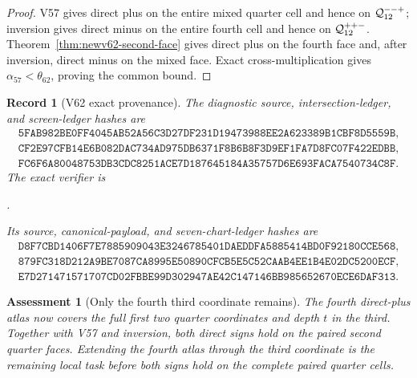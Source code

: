 \documentclass[11pt,oneside]{article}
\newtheorem{assessment}[theorem]{Assessment}
\newtheorem{record}[theorem]{Record}
\theoremstyle{definition}
\theoremstyle{remark}
\begin{document}
\begin{proof}
V57 gives direct plus on the entire mixed quarter cell and hence
on \({\cal Q}^{--+}_{12}\); inversion gives direct minus on the
entire fourth cell and hence on \({\cal Q}^{++-}_{12}\).
Theorem~\ref{thm:newv62-second-face} gives direct plus on the fourth
face and, after inversion, direct minus on the mixed face.  Exact
cross-multiplication gives \(\alpha_{57}<\theta_{62}\), proving the
common bound.
\end{proof}

\begin{record}[V62 exact provenance]
\label{rec:newv62-provenance}
The diagnostic source, intersection-ledger, and screen-ledger
hashes are
\[
\begin{gathered}
\texttt{5FAB982BE0FF4045AB52A56C3D27DF231D19473988EE2A623389B1CBF8D5559B},\\
\texttt{CF2E97CFB14E6B082DAC734AD975DB6371F8B6B8F3D9EF1FA7D8FC07F422EDBB},\\
\texttt{FC6F6A80048753DB3CDC8251ACE7D187645184A35757D6E693FACA7540734C8F}.
\end{gathered}                                        \tag{62.12}
\]
The exact verifier is
\begin{center}
\footnotesize
{}.
\end{center}
Its source, canonical-payload, and seven-chart-ledger hashes are
\[
\begin{gathered}
\texttt{D8F7CBD1406F7E7885909043E3246785401DAEDDFA5885414BD0F92180CCE568},\\
\texttt{879FC318D212A9BE7087CA8995E50890CFCB5E5C52CAAB4EE1B4E02DC5200ECF},\\
\texttt{E7D271471571707CD02FBBE99D302947AE42C147146BB985652670ECE6DAF313}.
\end{gathered}                                        \tag{62.13}
\]
\end{record}

\begin{assessment}[Only the fourth third coordinate remains]
\label{ass:newv62}
The fourth direct-plus atlas now covers the full first two quarter
coordinates and depth \(t\) in the third.  Together with V57 and
inversion, both direct signs hold on the paired second quarter
faces.  Extending the fourth atlas through the third coordinate is
the remaining local task before both signs hold on the complete
paired quarter cells.
\end{assessment}
\end{document}
